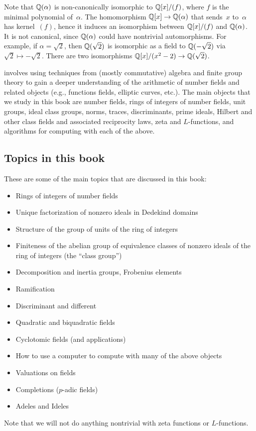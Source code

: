 Note that
$\mathbb{Q}(\alpha)$ is non-canonically isomorphic to $\mathbb{Q}[x]/(f)$, where $f$
is the minimal polynomial of~$\alpha$.
The homomorphism $\mathbb{Q}[x]\to\mathbb{Q}(\alpha)$ that sends~$x$ to~$\alpha$
has kernel~$(f)$, hence it induces an isomorphism between
$\mathbb{Q}[x]/(f)$ and $\mathbb{Q}(\alpha)$.
It is not canonical, since $\mathbb{Q}(\alpha)$ could
have nontrivial automorphisms.  For example, if $\alpha=\sqrt{2}$, then
$\mathbb{Q}(\sqrt{2})$ is isomorphic as a field to $\mathbb{Q}(-\sqrt{2})$ via
$\sqrt{2}\mapsto -\sqrt{2}$.  There are two isomorphisms
$\mathbb{Q}[x]/(x^2-2)\to \mathbb{Q}(\sqrt{2})$.

 involves using techniques from (mostly
commutative) algebra and finite group theory to gain a deeper
understanding of the arithmetic of number fields and related objects
(e.g., functions fields, elliptic curves, etc.).  The main objects that we
study in this book are number fields, rings of integers
of number fields, unit groups, ideal class groups, norms, traces,
discriminants, prime ideals, Hilbert and other class fields and
associated reciprocity laws, zeta and $L$-functions, and algorithms
for computing with each of the above.

\subsection{Topics in this book}
These are some of the main topics that are discussed in this book:
\begin{itemize}\setlength{\itemsep}{-.7ex}
\item Rings of integers of number fields
\item Unique factorization of nonzero ideals in Dedekind domains
\item Structure of the group of units of the ring of integers
\item Finiteness of the abelian group of equivalence classes
of nonzero ideals of the ring of integers (the ``class group'')
\item Decomposition and inertia groups, Frobenius elements
\item Ramification
\item Discriminant and different
\item Quadratic and biquadratic fields
\item Cyclotomic fields (and applications)
\item How to use a computer to compute with many of the above objects
\item Valuations on fields
\item Completions ($p$-adic fields)
\item Adeles and Ideles
\end{itemize}
Note that we will not do anything nontrivial with zeta functions or
$L$-functions. 




